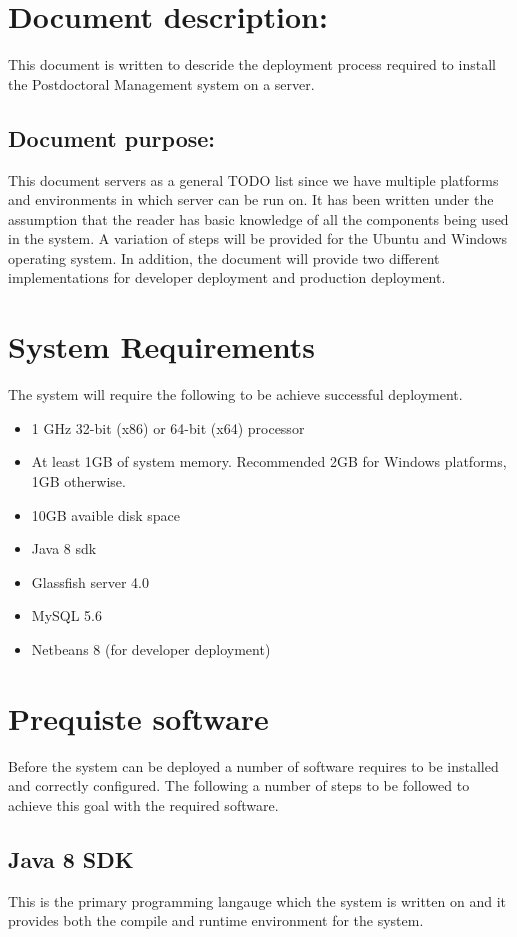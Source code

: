 \documentclass[12pt]{article}
\begin{document}
\listoffigures
\newpage
\section{Document description:}
This document is written to descride the deployment process required to install the Postdoctoral Management system on a server.
\subsection{Document purpose:}
\vspace{0.2in}
This document servers as a general TODO list since we have multiple platforms and environments in which server can be run on. It has been written under the assumption that the reader has basic knowledge of all the components being used in the system. A variation of steps will be provided for the Ubuntu and Windows operating system. In addition, the document will provide two different implementations for developer deployment and production deployment. 

\vspace{0.2in}

\section{System Requirements}
The system will require the following to be achieve successful deployment.
\begin{itemize}
\item 1 GHz 32-bit (x86) or 64-bit (x64) processor
\item At least 1GB of system memory. Recommended 2GB for Windows platforms, 1GB otherwise.
\item 10GB avaible disk space
\item Java 8 sdk
\item Glassfish server 4.0
\item MySQL 5.6
\item Netbeans 8 (for developer deployment)
\end{itemize}

\section{Prequiste software}
Before the system can be deployed a number of software requires to be installed and correctly configured. The following a number of steps to be followed to achieve this goal with the required software.
\subsection{Java 8 SDK}
This is the primary programming langauge which the system is written on and it provides both the compile and runtime environment for the system.
\end{document}
